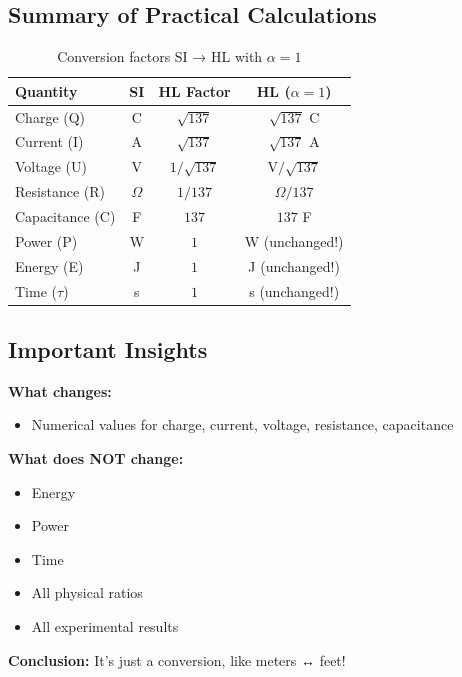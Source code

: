 	\subsection{Summary of Practical Calculations}
	
	\begin{table}[h]
		\centering
		\begin{tabular}{|l|c|c|c|}
			\hline
			\textbf{Quantity} & \textbf{SI} & \textbf{HL Factor} & \textbf{HL ($\alpha=1$)} \\
			\hline
			Charge (Q) & C & $\sqrt{137}$ & $\sqrt{137}$ C \\
			Current (I) & A & $\sqrt{137}$ & $\sqrt{137}$ A \\
			Voltage (U) & V & $1/\sqrt{137}$ & V$/\sqrt{137}$ \\
			Resistance (R) & $\Omega$ & $1/137$ & $\Omega/137$ \\
			Capacitance (C) & F & $137$ & $137$ F \\
			Power (P) & W & $1$ & W (unchanged!) \\
			Energy (E) & J & $1$ & J (unchanged!) \\
			Time ($\tau$) & s & $1$ & s (unchanged!) \\
			\hline
		\end{tabular}
		\caption{Conversion factors SI → HL with $\alpha = 1$}
	\end{table}
	
	\subsection{Important Insights}
	
	\begin{tcolorbox}[colback=green!5!white,colframe=green!75!black,title=Core Statement]
		\textbf{What changes:}
		\begin{itemize}
			\item Numerical values for charge, current, voltage, resistance, capacitance
		\end{itemize}
		
		\textbf{What does NOT change:}
		\begin{itemize}
			\item Energy
			\item Power
			\item Time
			\item All physical ratios
			\item All experimental results
		\end{itemize}
		
		\textbf{Conclusion:} It's just a conversion, like meters ↔ feet!
	\end{tcolorbox}
	
